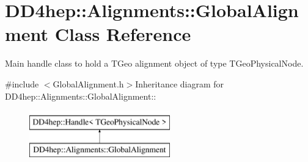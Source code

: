 \hypertarget{class_d_d4hep_1_1_alignments_1_1_global_alignment}{
\section{DD4hep::Alignments::GlobalAlignment Class Reference}
\label{class_d_d4hep_1_1_alignments_1_1_global_alignment}
}


Main handle class to hold a TGeo alignment object of type TGeoPhysicalNode.  


{\ttfamily \#include $<$GlobalAlignment.h$>$}Inheritance diagram for DD4hep::Alignments::GlobalAlignment::\begin{figure}[H]
\begin{center}
\leavevmode
\includegraphics[height=2cm]{class_d_d4hep_1_1_alignments_1_1_global_alignment}
\end{center}
\end{figure}
